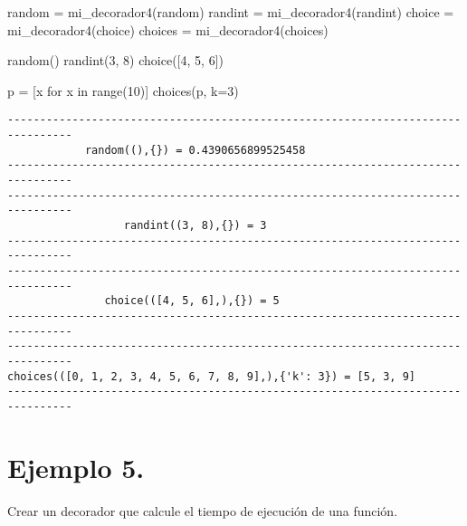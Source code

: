 \documentclass[
  letterpaper,
  DIV=11,
  numbers=noendperiod]{scrreprt}
\newenvironment{Shaded}{\begin{snugshade}}{\end{snugshade}}
\newcommand{\BuiltInTok}[1]{\textcolor[rgb]{0.00,0.23,0.31}{#1}}
\newcommand{\ControlFlowTok}[1]{\textcolor[rgb]{0.00,0.23,0.31}{#1}}
\newcommand{\DecValTok}[1]{\textcolor[rgb]{0.68,0.00,0.00}{#1}}
\newcommand{\KeywordTok}[1]{\textcolor[rgb]{0.00,0.23,0.31}{#1}}
\newcommand{\NormalTok}[1]{\textcolor[rgb]{0.00,0.23,0.31}{#1}}
\newcommand{\OperatorTok}[1]{\textcolor[rgb]{0.37,0.37,0.37}{#1}}
\begin{document}
\begin{Shaded}
\begin{Highlighting}[]
\NormalTok{random }\OperatorTok{=}\NormalTok{ mi\_decorador4(random)}
\NormalTok{randint }\OperatorTok{=}\NormalTok{ mi\_decorador4(randint)}
\NormalTok{choice }\OperatorTok{=}\NormalTok{ mi\_decorador4(choice)}
\NormalTok{choices }\OperatorTok{=}\NormalTok{ mi\_decorador4(choices)}

\NormalTok{random()}
\NormalTok{randint(}\DecValTok{3}\NormalTok{, }\DecValTok{8}\NormalTok{)}
\NormalTok{choice([}\DecValTok{4}\NormalTok{, }\DecValTok{5}\NormalTok{, }\DecValTok{6}\NormalTok{])}

\NormalTok{p }\OperatorTok{=}\NormalTok{ [x }\ControlFlowTok{for}\NormalTok{ x }\KeywordTok{in} \BuiltInTok{range}\NormalTok{(}\DecValTok{10}\NormalTok{)]}
\NormalTok{choices(p, k}\OperatorTok{=}\DecValTok{3}\NormalTok{)}
\end{Highlighting}
\end{Shaded}

\begin{verbatim}
--------------------------------------------------------------------------------
            random((),{}) = 0.4390656899525458            
--------------------------------------------------------------------------------
--------------------------------------------------------------------------------
                  randint((3, 8),{}) = 3                  
--------------------------------------------------------------------------------
--------------------------------------------------------------------------------
               choice(([4, 5, 6],),{}) = 5                
--------------------------------------------------------------------------------
--------------------------------------------------------------------------------
choices(([0, 1, 2, 3, 4, 5, 6, 7, 8, 9],),{'k': 3}) = [5, 3, 9]
--------------------------------------------------------------------------------
\end{verbatim}

\section{\texorpdfstring{\textbf{Ejemplo
5.}}{Ejemplo 5.}}\label{ejemplo-5.-3}

Crear un decorador que calcule el tiempo de ejecución de una función.
\end{document}
